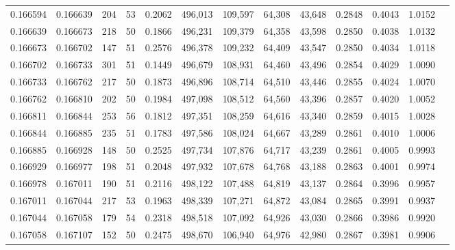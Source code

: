 \begin{tabular}{rrrrrrrrrrrrr}
0.166594 & 0.166639 &   204 &  53 &                                     0.2062 & 496,013 & 109,597 &  64,308 &  43,648 & 0.2848 & 0.4043 & 1.0152 \\
0.166639 & 0.166673 &   218 &  50 &                                     0.1866 & 496,231 & 109,379 &  64,358 &  43,598 & 0.2850 & 0.4038 & 1.0132 \\
0.166673 & 0.166702 &   147 &  51 &                                     0.2576 & 496,378 & 109,232 &  64,409 &  43,547 & 0.2850 & 0.4034 & 1.0118 \\
0.166702 & 0.166733 &   301 &  51 &                                     0.1449 & 496,679 & 108,931 &  64,460 &  43,496 & 0.2854 & 0.4029 & 1.0090 \\
0.166733 & 0.166762 &   217 &  50 &                                     0.1873 & 496,896 & 108,714 &  64,510 &  43,446 & 0.2855 & 0.4024 & 1.0070 \\
0.166762 & 0.166810 &   202 &  50 &                                     0.1984 & 497,098 & 108,512 &  64,560 &  43,396 & 0.2857 & 0.4020 & 1.0052 \\
0.166811 & 0.166844 &   253 &  56 &                                     0.1812 & 497,351 & 108,259 &  64,616 &  43,340 & 0.2859 & 0.4015 & 1.0028 \\
0.166844 & 0.166885 &   235 &  51 &                                     0.1783 & 497,586 & 108,024 &  64,667 &  43,289 & 0.2861 & 0.4010 & 1.0006 \\
0.166885 & 0.166928 &   148 &  50 &                                     0.2525 & 497,734 & 107,876 &  64,717 &  43,239 & 0.2861 & 0.4005 & 0.9993 \\
0.166929 & 0.166977 &   198 &  51 &                                     0.2048 & 497,932 & 107,678 &  64,768 &  43,188 & 0.2863 & 0.4001 & 0.9974 \\
0.166978 & 0.167011 &   190 &  51 &                                     0.2116 & 498,122 & 107,488 &  64,819 &  43,137 & 0.2864 & 0.3996 & 0.9957 \\
0.167011 & 0.167044 &   217 &  53 &                                     0.1963 & 498,339 & 107,271 &  64,872 &  43,084 & 0.2865 & 0.3991 & 0.9937 \\
0.167044 & 0.167058 &   179 &  54 &                                     0.2318 & 498,518 & 107,092 &  64,926 &  43,030 & 0.2866 & 0.3986 & 0.9920 \\
0.167058 & 0.167107 &   152 &  50 &                                     0.2475 & 498,670 & 106,940 &  64,976 &  42,980 & 0.2867 & 0.3981 & 0.9906 \\

\end{tabular}
